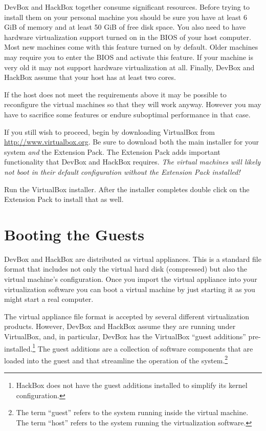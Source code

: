 \documentclass[twocolumn]{article}
\begin{document}
DevBox and HackBox together consume significant resources. Before trying to install them on your
personal machine you should be sure you have at least 6 GiB of memory and at least 50 GiB of
free disk space. You also need to have hardware virtualization support turned on in the BIOS of
your host computer. Most new machines come with this feature turned on by default. Older
machines may require you to enter the BIOS and activate this feature. If your machine is very
old it may not support hardware virtualization at all. Finally, DevBox and HackBox assume that
your host has at least two cores.

If the host does not meet the requirements above it may be possible to reconfigure the virtual
machines so that they will work anyway. However you may have to sacrifice some features or
endure suboptimal performance in that case.

If you still wish to proceed, begin by downloading VirtualBox from
\url{http://www.virtualbox.org}. Be sure to download both the main installer for your system
\emph{and} the Extension Pack. The Extension Pack adds important functionality that DevBox and
HackBox requires. \emph{The virtual machines will likely not boot in their default configuration
  without the Extension Pack installed!}

Run the VirtualBox installer. After the installer completes double click on the Extension Pack
to install that as well.

\section{Booting the Guests}
\label{sec:booting-guests}

DevBox and HackBox are distributed as virtual appliances. This is a standard file format that
includes not only the virtual hard disk (compressed) but also the virtual machine's
configuration. Once you import the virtual appliance into your virtualization software you can
boot a virtual machine by just starting it as you might start a real computer.

The virtual appliance file format is accepted by several different virtualization products.
However, DevBox and HackBox assume they are running under VirtualBox, and, in particular, DevBox
has the VirtualBox ``guest additions'' pre-installed.\footnote{HackBox does not have the guest
  additions installed to simplify its kernel configuration.} The guest additions are a
collection of software components that are loaded into the guest and that streamline the
operation of the system.\footnote{The term ``guest'' refers to the system running inside the
  virtual machine. The term ``host'' refers to the system running the virtualization software.}
\end{document}
